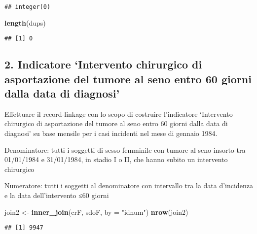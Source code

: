 \documentclass[]{article}
\newenvironment{Shaded}{\begin{snugshade}}{\end{snugshade}}
\newcommand{\DataTypeTok}[1]{\textcolor[rgb]{0.13,0.29,0.53}{#1}}
\newcommand{\KeywordTok}[1]{\textcolor[rgb]{0.13,0.29,0.53}{\textbf{#1}}}
\newcommand{\NormalTok}[1]{#1}
\newcommand{\OperatorTok}[1]{\textcolor[rgb]{0.81,0.36,0.00}{\textbf{#1}}}
\newcommand{\StringTok}[1]{\textcolor[rgb]{0.31,0.60,0.02}{#1}}
\begin{document}
\begin{verbatim}
## integer(0)
\end{verbatim}

\begin{Shaded}
\begin{Highlighting}[]
\KeywordTok{length}\NormalTok{(dups)}
\end{Highlighting}
\end{Shaded}

\begin{verbatim}
## [1] 0
\end{verbatim}

\hypertarget{indicatore-intervento-chirurgico-di-asportazione-del-tumore-al-seno-entro-60-giorni-dalla-data-di-diagnosi}{%
\subsection{2. Indicatore `Intervento chirurgico di asportazione del
tumore al seno entro 60 giorni dalla data di
diagnosi'}\label{indicatore-intervento-chirurgico-di-asportazione-del-tumore-al-seno-entro-60-giorni-dalla-data-di-diagnosi}}

Effettuare il record-linkage con lo scopo di costruire l'indicatore
`Intervento chirurgico di asportazione del tumore al seno entro 60
giorni dalla data di diagnosi' su base mensile per i casi incidenti nel
mese di gennaio 1984.

Denominatore: tutti i soggetti di sesso femminile con tumore al seno
insorto tra 01/01/1984 e 31/01/1984, in stadio I o II, che hanno subito
un intervento chirurgico

Numeratore: tutti i soggetti al denominatore con intervallo tra la data
d'incidenza e la data dell'intervento ≤60 giorni

\begin{Shaded}
\begin{Highlighting}[]
\NormalTok{join2 <-}\StringTok{ }\KeywordTok{inner_join}\NormalTok{(crF, sdoF, }\DataTypeTok{by =} \StringTok{"idnum"}\NormalTok{)}
\KeywordTok{nrow}\NormalTok{(join2)}
\end{Highlighting}
\end{Shaded}

\begin{verbatim}
## [1] 9947
\end{verbatim}

\begin{Shaded}
\end{Shaded}
\end{document}
